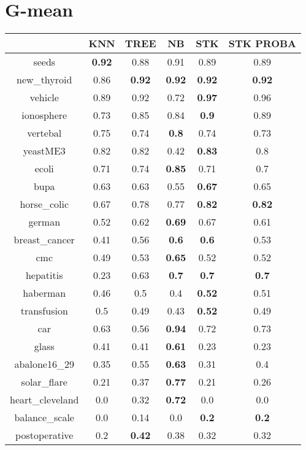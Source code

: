 \documentclass{article}%
\begin{document}
\section*{G{-}mean}%
\begin{tabular}{c|ccccc}%
&KNN&TREE&NB&STK&STK PROBA\\%
\hline%
seeds&\textbf{0.92}&0.88&0.91&0.89&0.89\\%
new\_thyroid&0.86&\textbf{0.92}&\textbf{0.92}&\textbf{0.92}&\textbf{0.92}\\%
vehicle&0.89&0.92&0.72&\textbf{0.97}&0.96\\%
ionosphere&0.73&0.85&0.84&\textbf{0.9}&0.89\\%
vertebal&0.75&0.74&\textbf{0.8}&0.74&0.73\\%
yeastME3&0.82&0.82&0.42&\textbf{0.83}&0.8\\%
ecoli&0.71&0.74&\textbf{0.85}&0.71&0.7\\%
bupa&0.63&0.63&0.55&\textbf{0.67}&0.65\\%
horse\_colic&0.67&0.78&0.77&\textbf{0.82}&\textbf{0.82}\\%
german&0.52&0.62&\textbf{0.69}&0.67&0.61\\%
breast\_cancer&0.41&0.56&\textbf{0.6}&\textbf{0.6}&0.53\\%
cmc&0.49&0.53&\textbf{0.65}&0.52&0.52\\%
hepatitis&0.23&0.63&\textbf{0.7}&\textbf{0.7}&\textbf{0.7}\\%
haberman&0.46&0.5&0.4&\textbf{0.52}&0.51\\%
transfusion&0.5&0.49&0.43&\textbf{0.52}&0.49\\%
car&0.63&0.56&\textbf{0.94}&0.72&0.73\\%
glass&0.41&0.41&\textbf{0.61}&0.23&0.23\\%
abalone16\_29&0.35&0.55&\textbf{0.63}&0.31&0.4\\%
solar\_flare&0.21&0.37&\textbf{0.77}&0.21&0.26\\%
heart\_cleveland&0.0&0.32&\textbf{0.72}&0.0&0.0\\%
balance\_scale&0.0&0.14&0.0&\textbf{0.2}&\textbf{0.2}\\%
postoperative&0.2&\textbf{0.42}&0.38&0.32&0.32\\%
\end{tabular}

%
\end{document}
